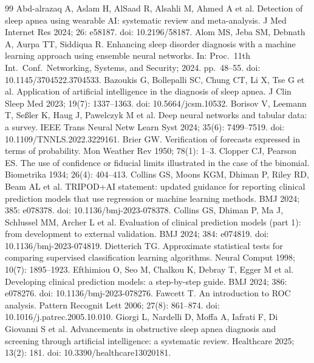 \documentclass[11pt,a4paper]{article}
\begin{document}
\small
\begin{thebibliography}{99}
 Abd-alrazaq A, Aslam H, AlSaad R, Alsahli M, Ahmed A et al. Detection of sleep apnea using wearable AI: systematic review and meta-analysis. J Med Internet Res 2024; 26: e58187. doi: 10.2196/58187.
 Alom MS, Jeba SM, Debnath A, Aurpa TT, Siddiqua R. Enhancing sleep disorder diagnosis with a machine learning approach using ensemble neural networks. In: Proc.\ 11th Int.\ Conf.\ Networking, Systems, and Security; 2024. pp.\ 48--55. doi: 10.1145/3704522.3704533.
 Bazoukis G, Bollepalli SC, Chung CT, Li X, Tse G et al. Application of artificial intelligence in the diagnosis of sleep apnea. J Clin Sleep Med 2023; 19(7): 1337--1363. doi: 10.5664/jcsm.10532.
 Borisov V, Leemann T, Se{\ss}ler K, Haug J, Pawelczyk M et al. Deep neural networks and tabular data: a survey. IEEE Trans Neural Netw Learn Syst 2024; 35(6): 7499--7519. doi: 10.1109/TNNLS.2022.3229161.
 Brier GW. Verification of forecasts expressed in terms of probability. Mon Weather Rev 1950; 78(1): 1--3.
 Clopper CJ, Pearson ES. The use of confidence or fiducial limits illustrated in the case of the binomial. Biometrika 1934; 26(4): 404--413.
 Collins GS, Moons KGM, Dhiman P, Riley RD, Beam AL et al. TRIPOD+AI statement: updated guidance for reporting clinical prediction models that use regression or machine learning methods. BMJ 2024; 385: e078378. doi: 10.1136/bmj-2023-078378.
 Collins GS, Dhiman P, Ma J, Schlussel MM, Archer L et al. Evaluation of clinical prediction models (part 1): from development to external validation. BMJ 2024; 384: e074819. doi: 10.1136/bmj-2023-074819.
 Dietterich TG. Approximate statistical tests for comparing supervised classification learning algorithms. Neural Comput 1998; 10(7): 1895--1923.
 Efthimiou O, Seo M, Chalkou K, Debray T, Egger M et al. Developing clinical prediction models: a step-by-step guide. BMJ 2024; 386: e078276. doi: 10.1136/bmj-2023-078276.
 Fawcett T. An introduction to ROC analysis. Pattern Recognit Lett 2006; 27(8): 861--874. doi: 10.1016/j.patrec.2005.10.010.
 Giorgi L, Nardelli D, Moffa A, Iafrati F, Di Giovanni S et al. Advancements in obstructive sleep apnea diagnosis and screening through artificial intelligence: a systematic review. Healthcare 2025; 13(2): 181. doi: 10.3390/healthcare13020181.

\end{thebibliography}
\end{document}
